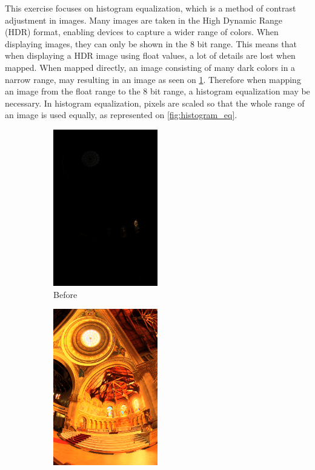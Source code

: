 This exercise focuses on histogram equalization, which is a method of contrast adjustment in images. Many images are taken in the High Dynamic Range (HDR) format, enabling devices to capture a wider range of colors. When displaying images, they can only be shown in the 8 bit range. This means that when displaying a HDR image using float values, a lot of details are lost when mapped. When mapped directly, an image consisting of many dark colors in a narrow range, may resulting in an image as seen on \cref{fig:ex3-before}.
Therefore when mapping an image from the float range to the 8 bit range, a histogram equalization may be necessary. In histogram equalization, pixels are scaled so that the whole range of an image is used equally, as represented on \cref{fig:histogram_eq}. 

\begin{figure}[ht]
	\centering
	\begin{subfigure}{.5\textwidth}
		\centering
		\includegraphics[width=0.5\textwidth]{figs/exercises/ex3/memorial_raw.png}
		\caption{Before}
		\label{fig:ex3-before}
	\end{subfigure}%
	\begin{subfigure}{.5\textwidth}
		\centering
		\includegraphics[width=0.5\textwidth]{figs/exercises/ex3/memorial_gold.png}

\end{subfigure}
\end{figure}
